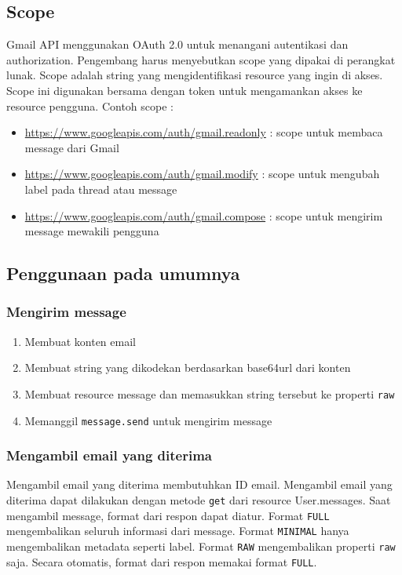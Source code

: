 \subsection{Scope}
Gmail API menggunakan OAuth 2.0 untuk menangani autentikasi dan authorization. Pengembang harus menyebutkan scope yang dipakai di perangkat lunak. Scope adalah string yang mengidentifikasi resource yang ingin di akses. Scope ini digunakan bersama dengan token untuk mengamankan akses ke resource pengguna. Contoh scope :
\begin{itemize}
\item \url{https://www.googleapis.com/auth/gmail.readonly} : scope untuk membaca message dari Gmail
\item \url{https://www.googleapis.com/auth/gmail.modify} : scope untuk mengubah label pada thread atau message
\item \url{https://www.googleapis.com/auth/gmail.compose} : scope untuk mengirim message mewakili pengguna
\end{itemize}

\subsection{Penggunaan pada umumnya}
\subsubsection{Mengirim message}
\begin{enumerate}
\item Membuat konten email
\item Membuat string yang dikodekan berdasarkan base64url dari konten
\item Membuat resource message dan memasukkan string tersebut ke properti \texttt{raw}
\item Memanggil \texttt{message.send} untuk mengirim message
\end{enumerate}

\subsubsection{Mengambil email yang diterima}
Mengambil email yang diterima membutuhkan ID email. Mengambil email yang diterima dapat dilakukan dengan metode \texttt{get} dari resource User.messages. Saat mengambil message, format dari respon dapat diatur. Format \texttt{FULL} mengembalikan seluruh informasi dari message. Format \texttt{MINIMAL} hanya mengembalikan metadata seperti label. Format \texttt{RAW} mengembalikan properti \texttt{raw} saja. Secara otomatis, format dari respon memakai format \texttt{FULL}.

